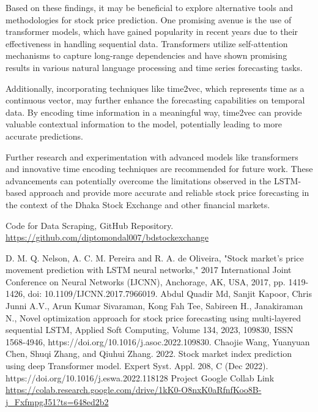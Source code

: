 \documentclass[conference]{IEEEtran}
\begin{document}
Based on these findings, it may be beneficial to explore alternative tools and methodologies for stock price prediction. One promising avenue is the use of transformer models, which have gained popularity in recent years due to their effectiveness in handling sequential data\cite{trans}. Transformers utilize self-attention mechanisms to capture long-range dependencies and have shown promising results in various natural language processing and time series forecasting tasks.

Additionally, incorporating techniques like time2vec, which represents time as a continuous vector, may further enhance the forecasting capabilities on temporal data. By encoding time information in a meaningful way, time2vec can provide valuable contextual information to the model, potentially leading to more accurate predictions.

Further research and experimentation with advanced models like transformers and innovative time encoding techniques are recommended for future work. These advancements can potentially overcome the limitations observed in the LSTM-based approach and provide more accurate and reliable stock price forecasting in the context of the Dhaka Stock Exchange and other financial markets.

\begin{thebibliography}{00}
 Code for Data Scraping, GitHub Repository. \\
\url{https://github.com/diptomondal007/bdstockexchange}

 D. M. Q. Nelson, A. C. M. Pereira and R. A. de Oliveira, "Stock market's price movement prediction with LSTM neural networks," 2017 International Joint Conference on Neural Networks (IJCNN), Anchorage, AK, USA, 2017, pp. 1419-1426, doi: 10.1109/IJCNN.2017.7966019.
 Abdul Quadir Md, Sanjit Kapoor, Chris Junni A.V., Arun Kumar Sivaraman, Kong Fah Tee, Sabireen H., Janakiraman N.,
Novel optimization approach for stock price forecasting using multi-layered sequential LSTM,
Applied Soft Computing,
Volume 134,
2023,
109830,
ISSN 1568-4946,
https://doi.org/10.1016/j.asoc.2022.109830.
Chaojie Wang, Yuanyuan Chen, Shuqi Zhang, and Qiuhui Zhang. 2022. 
Stock market index prediction using deep Transformer model. 
Expert Syst. Appl. 208, C (Dec 2022). 
https://doi.org/10.1016/j.eswa.2022.118128
 Project Google Collab Link 
\url{https://colab.research.google.com/drive/1kK0-O8nxK0aRfnfKoo8B-j_FxfmpgJ51?ts=648ed2b2}
\end{thebibliography}
\end{document}
